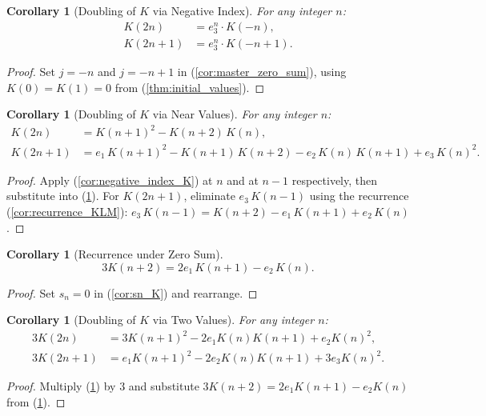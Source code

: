 \documentclass[12pt]{article}
\newtheorem{corollary}[theorem]{Corollary}
\theoremstyle{definition}
\begin{document}
	\begin{corollary}[Doubling of $K$ via Negative Index]
		\label{cor:K_doubling_neg}
		For any integer $n$:
		\begin{align*}
			K(2n)   &= e_3^n\cdot K(-n), \\
			K(2n+1) &= e_3^n\cdot K(-n+1).
		\end{align*}
	\end{corollary}
	\begin{proof}
		Set $j = -n$ and $j = -n+1$ in (\ref{cor:master_zero_sum}), using $K(0) = K(1) = 0$ from (\ref{thm:initial_values}).
	\end{proof}
	
	\begin{corollary}[Doubling of $K$ via Near Values]
		\label{cor:K_doubling_near}
		For any integer $n$:
		\begin{align*}
			K(2n)   &= K(n+1)^2 - K(n+2)\,K(n), \\
			K(2n+1) &= e_1\,K(n+1)^2 - K(n+1)\,K(n+2) - e_2\,K(n)\,K(n+1) + e_3\,K(n)^2.
		\end{align*}
	\end{corollary}
	\begin{proof}
		Apply (\ref{cor:negative_index_K}) at $n$ and at $n-1$ respectively, then substitute into (\ref{cor:K_doubling_neg}). For $K(2n+1)$, eliminate $e_3\,K(n-1)$ using the recurrence (\ref{cor:recurrence_KLM}): $e_3\,K(n-1) = K(n+2) - e_1\,K(n+1) + e_2\,K(n)$.
	\end{proof}
	
	\begin{corollary}[Recurrence under Zero Sum]
		\label{cor:sn_zero_K}
		\[ 3K(n+2) = 2e_1\,K(n+1) - e_2\,K(n). \]
	\end{corollary}
	\begin{proof}
		Set $s_n = 0$ in (\ref{cor:sn_K}) and rearrange.
	\end{proof}
	
	\begin{corollary}[Doubling of $K$ via Two Values]
		\label{cor:K_doubling_two}
		For any integer $n$:
		\begin{align*}
			3K(2n)   &= 3K(n+1)^2 - 2e_1 K(n)K(n+1) + e_2 K(n)^2, \\
			3K(2n+1) &= e_1 K(n+1)^2 - 2e_2 K(n)K(n+1) + 3e_3 K(n)^2.
		\end{align*}
	\end{corollary}
	\begin{proof}
		Multiply (\ref{cor:K_doubling_near}) by $3$ and substitute $3K(n+2) = 2e_1 K(n+1) - e_2 K(n)$ from (\ref{cor:sn_zero_K}).
	\end{proof}
	
\end{document}

